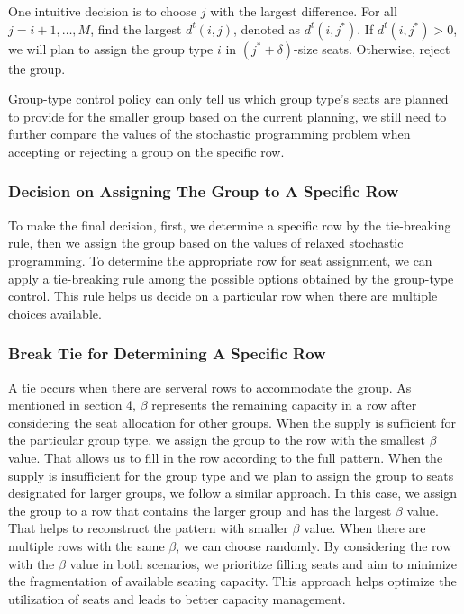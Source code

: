 One intuitive decision is to choose $j$ with the largest difference. For all $j = i+1, \ldots, M$, find the largest $d^{t}(i,j)$, denoted as $d^{t}(i,j^{*})$. If $d^{t}(i,j^{*}) >0$, we will plan to assign the group type $i$ in $(j^{*}+\delta)$-size seats. Otherwise, reject the group.

Group-type control policy can only tell us which group type's seats are planned to provide for the smaller group based on the current planning, we still need to further compare the values of the stochastic programming problem when accepting or rejecting a group on the specific row. 

\subsubsection{Decision on Assigning The Group to A Specific Row}
To make the final decision, first, we determine a specific row by the tie-breaking rule, then we assign the group based on the values of relaxed stochastic programming. To determine the appropriate row for seat assignment, we can apply a tie-breaking rule among the possible options obtained by the group-type control. This rule helps us decide on a particular row when there are multiple choices available. 

\subsubsection*{Break Tie for Determining A Specific Row}
A tie occurs when there are serveral rows to accommodate the group. As mentioned in section 4, $\beta$ represents the remaining capacity in a row after considering the seat allocation for other groups.
When the supply is sufficient for the particular group type, we assign the group to the row with the smallest $\beta$ value. That allows us to fill in the row according to the full pattern. When the supply is insufficient for the group type and we plan to assign the group to seats designated for larger groups, we follow a similar approach. In this case, we assign the group to a row that contains the larger group and has the largest $\beta$ value. That helps to reconstruct the pattern with smaller $\beta$ value. When there are multiple rows with the same $\beta$, we can choose randomly. By considering the row with the $\beta$ value in both scenarios, we prioritize filling seats and aim to minimize the fragmentation of available seating capacity. This approach helps optimize the utilization of seats and leads to better capacity management.

